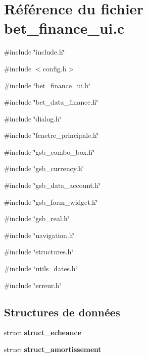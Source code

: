 \section{Référence du fichier bet\_\-finance\_\-ui.c}
\label{bet__finance__ui_8c}
{\ttfamily \#include \char`\"{}include.h\char`\"{}}\par
{\ttfamily \#include $<$config.h$>$}\par
{\ttfamily \#include \char`\"{}bet\_\-finance\_\-ui.h\char`\"{}}\par
{\ttfamily \#include \char`\"{}bet\_\-data\_\-finance.h\char`\"{}}\par
{\ttfamily \#include \char`\"{}dialog.h\char`\"{}}\par
{\ttfamily \#include \char`\"{}fenetre\_\-principale.h\char`\"{}}\par
{\ttfamily \#include \char`\"{}gsb\_\-combo\_\-box.h\char`\"{}}\par
{\ttfamily \#include \char`\"{}gsb\_\-currency.h\char`\"{}}\par
{\ttfamily \#include \char`\"{}gsb\_\-data\_\-account.h\char`\"{}}\par
{\ttfamily \#include \char`\"{}gsb\_\-form\_\-widget.h\char`\"{}}\par
{\ttfamily \#include \char`\"{}gsb\_\-real.h\char`\"{}}\par
{\ttfamily \#include \char`\"{}navigation.h\char`\"{}}\par
{\ttfamily \#include \char`\"{}structures.h\char`\"{}}\par
{\ttfamily \#include \char`\"{}utils\_\-dates.h\char`\"{}}\par
{\ttfamily \#include \char`\"{}erreur.h\char`\"{}}\par
\subsection*{Structures de données}
\begin{DoxyCompactItemize}
\item 
struct {\bf struct\_\-echeance}
\item 
struct {\bf struct\_\-amortissement}
\end{DoxyCompactItemize}
